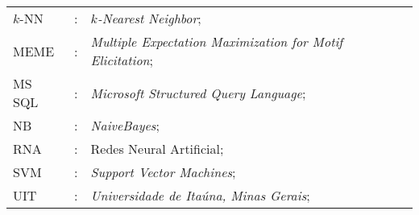 \cleardoublepage
{}
\begin{tabular}{lcl}

$k$-NN & : & \textit{$k$-Nearest Neighbor};\\
MEME & : & \textit{Multiple Expectation Maximization for Motif Elicitation};\\
MS SQL & : & \textit{Microsoft Structured Query Language};\\
NB & : & \textit{NaiveBayes};\\
RNA & : & Redes Neural Artificial;\\
SVM & : & \textit{Support Vector Machines};\\
UIT & : & \textit{Universidade de Ita\'una, Minas Gerais};\\
\end{tabular}
